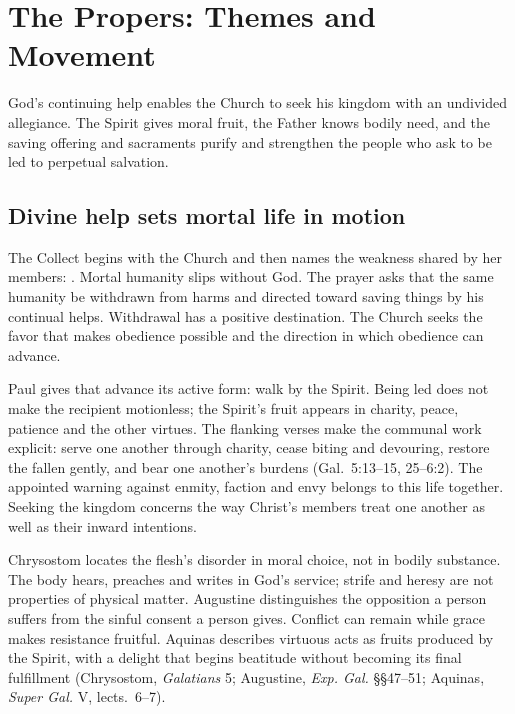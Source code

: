 \section*{The Propers: Themes and Movement}
\label{triptych:brief-synthesis:start}
\begingroup\fontsize{9.5}{11.5}\selectfont
\setlength{\parskip}{0.32em}

God's continuing help enables the Church to seek his kingdom with an undivided
allegiance. The Spirit gives moral fruit, the Father knows bodily need, and
the saving offering and sacraments purify and strengthen the people who ask
to be led to perpetual salvation.

\subsection*{Divine help sets mortal life in motion\enspace{}}

The Collect begins with the Church and then names the weakness shared by her
members: . Mortal humanity slips
without God. The prayer asks that the same humanity be withdrawn from harms
and directed toward saving things by his continual helps. Withdrawal has a
positive destination. The Church seeks the favor that makes obedience
possible and the direction in which obedience can advance.

Paul gives that advance its active form: walk by the Spirit. Being led does
not make the recipient motionless; the Spirit's fruit appears in charity,
peace, patience and the other virtues. The flanking verses make the communal
work explicit: serve one another through charity, cease biting and devouring,
restore the fallen gently, and bear one another's burdens
(Gal.~5:13--15, 25--6:2). The appointed warning against enmity, faction and
envy belongs to this life together. Seeking the kingdom concerns the way
Christ's members treat one another as well as their inward intentions.

Chrysostom locates the flesh's disorder in moral choice, not in bodily
substance. The body hears, preaches and writes in God's service; strife and
heresy are not properties of physical matter. Augustine distinguishes the
opposition a person suffers from the sinful consent a person gives. Conflict
can remain while grace makes resistance fruitful. Aquinas describes virtuous
acts as fruits produced by the Spirit, with a delight that begins beatitude
without becoming its final fulfillment (Chrysostom, \emph{Galatians} 5;
Augustine, \emph{Exp. Gal.} §§47--51; Aquinas, \emph{Super Gal.} V,
lects.~6--7).

